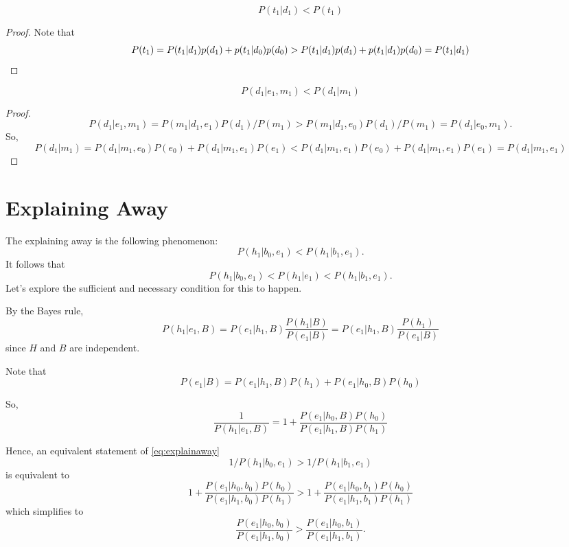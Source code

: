 \documentclass{discussion}
\begin{document}
\begin{corollary}
\[	P(t_1 | d_1) < P(t_1)\]
\end{corollary}
\begin{proof}
	Note that 
	\[P(t_1) = P(t_1 | d_1) p(d_1) + p(t_1 | d_0) p(d_0) > P(t_1 | d_1) p(d_1) + p(t_1 | d_1) p(d_0) = P(t_1 | d_1)\qedhere\]
\end{proof}

\begin{lemma}
\[	P(d_1 | e_1, m_1) < P(d_1 | m_1)\]
\end{lemma}
\begin{proof}
\[	P(d_1 | e_1, m_1)
 = P(m_1 | d_1, e_1) P(d_1) / P(m_1)
 > P(m_1 | d_1, e_0) P(d_1) / P(m_1)
 = P(d_1 | e_0, m_1).
\]
So,
\[P(d_1 | m_1) = P(d_1 | m_1, e_0) P(e_0) + P(d_1 | m_1, e_1)P(e_1) < P(d_1 | m_1, e_1) P(e_0) + P(d_1 | m_1, e_1)P(e_1) = P(d_1 | m_1,e_1)\]
\end{proof}

\section{Explaining Away}
The explaining away is the following phenomenon:
\begin{equation}
\label{eq:explainaway}
	P(h_1 | b_0, e_1) < P(h_1 | b_1, e_1).
\end{equation}
It follows that
\[P(h_1 | b_0, e_1) < P(h_1 | e_1)< P(h_1 | b_1, e_1).\]
Let's explore the sufficient and necessary condition for this to happen.

By the Bayes rule,
\[P(h_1 | e_1, B) = P(e_1 | h_1, B) \frac{P(h_1 | B)}{P(e_1 | B)} = P(e_1 | h_1, B) \frac{P(h_1)}{P(e_1 | B)}\]
since $H$ and $B$ are independent.



Note that
\[P(e_1 | B) = P(e_1 | h_1, B)P(h_1) + P(e_1 | h_0, B)P(h_0)\]

So, 
\[\frac{1}{P(h_1|e_1,B)}
= 1 + \frac{P(e_1 | h_0, B)P(h_0)}{P(e_1|h_1,B)P(h_1)}\]

Hence, an equivalent statement of \eqref{eq:explainaway}
\[	1/P(h_1 | b_0, e_1) > 1/P(h_1 | b_1, e_1)
\]
is equivalent to 
\[1 + \frac{P(e_1 | h_0, b_0)P(h_0)}{P(e_1|h_1,b_0)P(h_1)} > 1 + \frac{P(e_1 | h_0, b_1)P(h_0)}{P(e_1|h_1,b_1)P(h_1)}
\]
which simplifies to
\[\frac{P(e_1 | h_0, b_0)}{P(e_1|h_1,b_0)} > \frac{P(e_1 | h_0, b_1)}{P(e_1|h_1,b_1)}.\]
\end{document}
